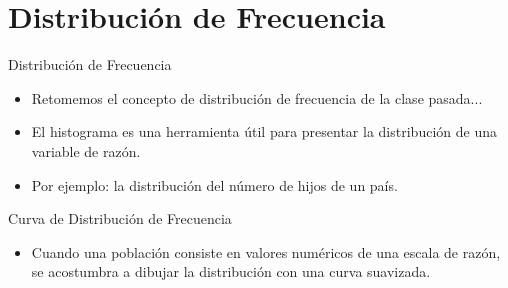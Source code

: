 \documentclass[xcolor=dvipsnames]{beamer}
\begin{document}
\section{Distribución de Frecuencia}

\begin{frame}{Distribución de Frecuencia}
	\begin{itemize}
		\justifying
		\item Retomemos el concepto de distribución de frecuencia de la clase pasada... 
		\pause \item El histograma es una herramienta útil para presentar la distribución de una variable de razón.
		\item Por ejemplo: la distribución del número de hijos de un país. 
	\end{itemize}
	\begin{center}
		
	\end{center}
	
\end{frame}

\begin{frame}{Curva de Distribución de Frecuencia}
	\begin{itemize}
		\justifying
		\item Cuando una población consiste en valores numéricos de una escala de razón, se acostumbra a dibujar la distribución con una curva suavizada. 
		
	\end{itemize}
	\begin{center}
	\end{center}
\end{frame}
\end{document}
